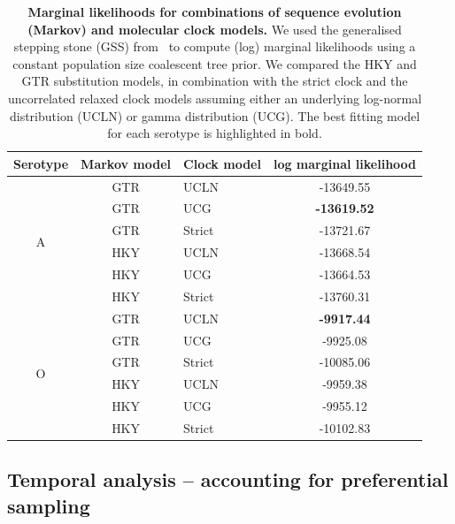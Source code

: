 \documentclass[a4paper,10pt]{article}
\begin{document}
\begin{table}[!ht]
\caption{\textbf{Marginal likelihoods for combinations of sequence evolution (Markov) and molecular clock models.}
We used the generalised stepping stone (GSS) from~\citep{M-Baele2015} to compute (log) marginal likelihoods using a constant population size coalescent tree prior.
We compared the HKY and GTR substitution models, in combination with the strict clock and the uncorrelated relaxed clock models assuming either an underlying log-normal distribution (UCLN) or gamma distribution (UCG).
The best fitting model for each serotype is highlighted in bold.
}
\begin{center}
 \begin{tabular}{cclc}
\hline
Serotype & Markov model & Clock model & log marginal likelihood \\
\hline
\multirow{6}{*}{A} & GTR & UCLN & -13649.55 \\
 & GTR & UCG & \textbf{-13619.52} \\
 & GTR & Strict & -13721.67 \\
 & HKY & UCLN & -13668.54 \\
 & HKY & UCG & -13664.53 \\
 & HKY & Strict & -13760.31 \\
 \hline
\multirow{6}{*}{O}& GTR & \multicolumn{1}{l}{UCLN} & \textbf{-9917.44} \\
\multicolumn{1}{l}{} & GTR & \multicolumn{1}{l}{UCG} & -9925.08 \\
\multicolumn{1}{l}{} & GTR & \multicolumn{1}{l}{Strict} & -10085.06 \\
\multicolumn{1}{l}{} & HKY & \multicolumn{1}{l}{UCLN} & -9959.38 \\
\multicolumn{1}{l}{} & HKY & \multicolumn{1}{l}{UCG} & -9955.12 \\
\multicolumn{1}{l}{} & HKY & \multicolumn{1}{l}{Strict} & -10102.83\\
\hline
\end{tabular}
\end{center}
\label{stab:treeclockselection}
\end{table}
\newpage

\subsection*{Temporal analysis -- accounting for preferential sampling}
\end{document}
